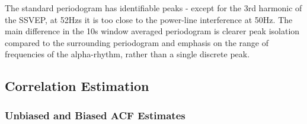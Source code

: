 \documentclass[12pt]{article}
\begin{document}
	The standard periodogram has identifiable peaks - except for the 3rd harmonic of the SSVEP, at 52Hzs it is too close to the power-line interference at 50Hz. The main difference in the 10s window averaged periodogram is clearer peak isolation compared to the surrounding periodogram and emphasis on the range of frequencies of the alpha-rhythm, rather than a single discrete peak.

	\subsection{Correlation Estimation} \label{sec: 1-3-correlation-est}
	
	\subsubsection{Unbiased and Biased ACF Estimates}
	
\end{document}
